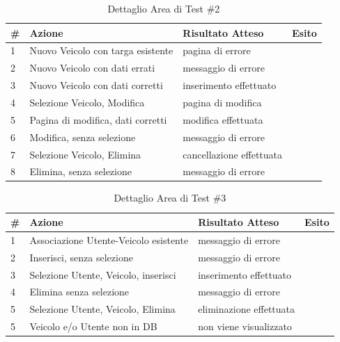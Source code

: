 \documentclass[a4paper,12pt]{article}
\begin{document}
\begin{table}[H]
\begin{center}
\caption{Dettaglio Area di Test \#2}
\begin{tabular}{p{0.5cm} p{6.5cm} p{5cm} p{1cm}}
\rowcolor{Ash}
\hline
\# & Azione & Risultato Atteso & Esito \\ \hline
1 & Nuovo Veicolo con targa esistente				&		pagina di errore		&\cellcolor{green}{OK}\\
2 & Nuovo Veicolo con dati errati					&		messaggio di errore		&\cellcolor{green}{OK}\\
3 & Nuovo Veicolo con dati corretti					&		inserimento effettuato	&\cellcolor{green}{OK}\\
4 & Selezione Veicolo, Modifica					&		pagina di modifica		&\cellcolor{green}{OK}\\
5 & Pagina di modifica, dati corretti					&		modifica effettuata		&\cellcolor{green}{OK}\\
6 & Modifica, senza selezione						&		messaggio di errore		&\cellcolor{green}{OK}\\
7 & Selezione Veicolo, Elimina						&		cancellazione effettuata	&\cellcolor{green}{OK}\\
8 & Elimina, senza selezione						&		messaggio di errore		&\cellcolor{green}{OK}\\ \hline
\end{tabular}
\end{center}
\end{table}

\begin{table}[H]
\begin{center}
\caption{Dettaglio Area di Test \#3}
\begin{tabular}{p{0.5cm} p{7cm} p{4.5cm} p{1cm}}
\rowcolor{Ash}
\hline
\# & Azione & Risultato Atteso & Esito \\ \hline
1 & Associazione Utente-Veicolo esistente			&		messaggio di errore		&\cellcolor{green}{OK}\\
2 & Inserisci, senza selezione						&		messaggio di errore		&\cellcolor{green}{OK}\\
3 & Selezione Utente, Veicolo, inserisci				&		inserimento effettuato	&\cellcolor{green}{OK}\\
4 & Elimina senza selezione						&		messaggio di errore		&\cellcolor{green}{OK}\\
5 & Selezione Utente, Veicolo, Elimina				&		eliminazione effettuata	&\cellcolor{green}{OK}\\
5 & Veicolo e/o Utente non in DB					&		non viene visualizzato	&\cellcolor{green}{OK}\\ \hline
\end{tabular}
\end{center}
\end{table}
\end{document}
